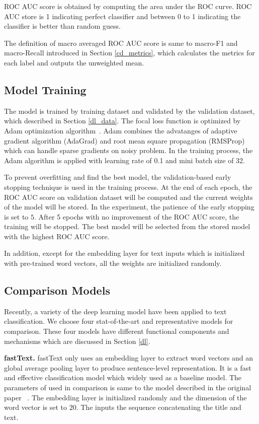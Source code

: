 ROC AUC score is obtained by computing the area under the ROC curve. ROC AUC store is 1 indicating perfect classifier and between 0 to 1 indicating the classifier is better than random guess. 

The definition of macro averaged ROC AUC score is same to macro-F1 and macro-Recall introduced in Section \ref{cd_metrics}, which calculates the metrics for each label and outputs the unweighted mean.

\subsection{Model Training}
The model is trained by training dataset and 
validated by the validation dataset, which described in Section \ref{dl_data}. The focal loss function is optimized by Adam optimization algorithm~\cite{Kingma2014}. Adam combines the advatanges of adaptive gradient algorithm (AdaGrad) and root mean square propagation (RMSProp) which can handle sparse gradients on noisy problem. In the training process, the Adam algorithm is applied with learning rate of 0.1 and mini batch size of 32.

To prevent overfitting and find the best model, the validation-based early stopping technique is used in the training process. 
At the end of each epoch, the ROC AUC score on validation dataset will be computed and the current weights of the model will be stored. In the experiment, the patience of the early stopping is set to $5$. After 5 epochs with no improvement of the ROC AUC score, the training will be stopped. The best model will be selected from the stored model with the highest ROC AUC score. 

In addition, except for the embedding layer for text inputs which is initialized with pre-trained word vectors, all the weights are initialized randomly. 

\subsection{Comparison Models}
Recently, a variety of the deep learning model have been applied to text classification. We choose four stat-of-the-art and representative models for comparison. These four models have different functional components and mechanisms which are discussed in Section \ref{dl}.

\textbf{fastText.} fastText only uses an embedding layer to extract word vectors and an global average pooling layer to produce sentence-level representation. It is a fast and effective classification model which widely used as a baseline model. The parameters of used in comparison is same to the model described in the original paper ~\cite{Joulin2016}. The embedding layer is initialized randomly and the dimension of the word vector is set to $20$. The inputs the sequence concatenating the title and text.

